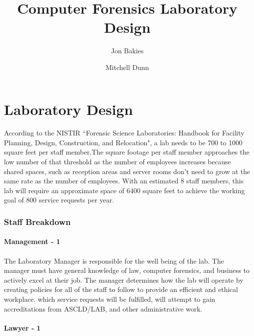 \documentclass{article}
\begin{document}
\title{Computer Forensics Laboratory Design}
\author{Jon Bakies \and Mitchell Dunn} 

\maketitle
\newpage

\tableofcontents
\newpage


\section{Laboratory Design}
\paragraph{} According to the NISTIR ``Forensic Science Laboratories: Handbook for Facility Planning, Design, Construction, and Relocation", a lab needs to be 700 to 1000 square feet per staff member.The square footage per staff member approaches the low number of that threshold as the number of employees increases because shared spaces, such as reception areas and server rooms don't need to grow at the same rate as the number of employees.  With an estimated 8 staff members, this lab will require an approximate space of 6400 square feet to achieve the working goal of 800 service requests per year.
\subsubsection{Staff Breakdown}
\paragraph {Management - 1} 
\paragraph{} The Laboratory Manager is responsible for the well being of the lab.  The manager must have general knowledge of law, computer forensics, and business to actively excel at their job.  The manager determines how the lab will operate by creating policies for all of the staff to follow to provide an efficient and ethical workplace.  which service requests will be fulfilled, will attempt to gain accreditations from ASCLD/LAB, and other administrative work.  
 
\paragraph{Lawyer - 1} 
\end{document}
